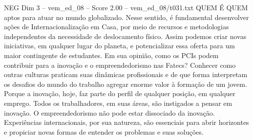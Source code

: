 \begin{textsample}{NEG Dim 3 – vem\_ed\_08 – Score 2.00 – vem\_ed\_08/t031.txt}  \label{ex:f3_neg_089}
QUEM É QUEM aptos para atuar no mundo globalizado.
Nesse sentido, é fundamental desenvolver ações de Internacionalização em Casa, por meio de recursos e metodologias independentes da necessidade de deslocamento físico.
Assim podemos criar novas iniciativas, em qualquer lugar do planeta, e potencializar essa oferta para um maior contingente de estudantes.
Em sua opinião, como os PCIs podem contribuir para a inovação e o empreendedorismo nas Fatecs?
Conhecer como outras culturas praticam suas dinâmicas profissionais e de que forma interpretam os desafios do mundo do trabalho agregar enorme valor à formação de um jovem.
Porque a inovação, hoje, faz parte do perfil de qualquer posição, em qualquer emprego.
Todos os trabalhadores, em suas áreas, são instigados a pensar em inovação.
O empreendedorismo não pode estar dissociado da inovação.
Experiências internacionais, por sua natureza, são essenciais para abrir horizontes e propiciar novas formas de entender os problemas e suas soluções.

\end{textsample}
